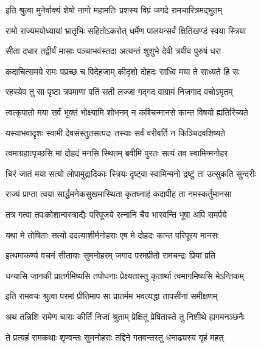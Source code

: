 
\twolineshloka
{इति श्रुत्वा मुनेर्वाक्यं शेषो नागो महामतिः}
{प्रशस्य विप्रं जगदे रामचारित्रमद्भुतम्}%


\twolineshloka
{रामो राज्यमयोध्यायां भ्रातृभिः सहितोऽकरोत्}
{धर्मेण पालयन्सर्वं क्षितिखण्डं स्वया स्त्रिया}%

\twolineshloka
{सीता दधार तद्वीर्यं मासाः पञ्चाभवंस्तदा}
{अत्यन्तं शुशुभे देवी त्रयीव पुरुषं धरा}%

\twolineshloka
{कदाचित्समये रामः पप्रच्छ च विदेहजाम्}
{कीदृशो दोहदः साध्वि मया ते साध्यते हि सः}%

\twolineshloka
{रहस्येव तु सा पृष्टा त्रपमाणा पतिं सती}
{लज्जा गद्गद वाग्रामं निजगाद वचोऽमृतम्}%


\twolineshloka
{त्वत्कृपातो मया सर्वं भुक्तं भोक्ष्यामि शोभनम्}
{न कश्चिन्मानसे कान्त विषयो ह्यतिरिच्यते}%

\twolineshloka
{यस्याभवादृशः स्वामी देवसंस्तुतसत्पदः}
{तस्याः सर्वं वरीवर्ति न किञ्चिदवशिष्यते}%

\twolineshloka
{त्वमाग्रहात्पृच्छसि मां दोहदं मनसि स्थितम्}
{ब्रवीमि पुरतः सत्यं तव स्वामिन्मनोहर}%

\twolineshloka
{चिरं जातं मया सत्यो लोपामुद्रादिकाः स्त्रियः}
{दृष्ट्वा स्वामिन्मनो द्रष्टुं ता उत्सुकति सुन्दरीः}%

\twolineshloka
{राज्यं प्राप्ता त्वया सार्द्धमनेकसुखमास्थिता}
{कृतघ्नाहं कदापीह ता नमस्कर्तुमानसा}%

\twolineshloka
{तत्र गत्वा तपःकोशान्वस्त्राद्यैः परिपूजये}
{रत्नानि चैव भास्वन्ति भूषा अपि समर्पये}%

\twolineshloka
{यथा मे तोषिताः सत्यो ददत्याशीर्मनोहराः}
{एष मे दोहदः कान्त परिपूरय मानसः}%

\twolineshloka
{इत्थमाकर्ण्य वचनं सीतायाः सुमनोहरम्}
{जगाद परमप्रीतो रामचन्द्रः प्रियां प्रति}%

\twolineshloka
{धन्यासि जानकी प्रातर्गमिष्यसि तपोधनाः}
{प्रेक्ष्यतास्तु कृतार्था त्वमागमिष्यसि मेऽन्तिकम्}%

\twolineshloka
{इति रामवचः श्रुत्वा परमां प्रीतिमाप सा}
{प्रातर्मम भवत्यद्धा तापसीनां समीक्षणम्}%

\twolineshloka
{अथ तन्निशि रामेण चाराः कीर्तिं निजां श्रुताम्}
{प्रेक्षितुं प्रेषितास्ते तु निशीथे ह्यगमनञ्छनैः}%

\twolineshloka
{ते प्रत्यहं रामकथाः शृण्वन्तः सुमनोहराः}
{तद्दिने गतवन्तस्तु धनाढ्यस्य गृहं महत्}%

